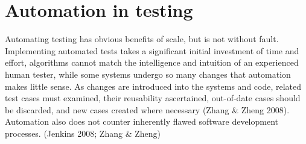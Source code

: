 \documentclass[12pt,a4paper,oneside,pdftex]{report}
\begin{document}
\begin{comment}
\begin{center}
    \begin{tabular}{ | l | l | l | p{5cm} |}
    \hline
    f & Interpretation error & Miscoded call error & Interface error \\ \hline
    Wrong & Unspecified function & Call at wrong location & Stardards or agreements are violated \\ \hline
    Missing & Not all necessary functionality implemented & Call instruction missing & Stardards or agreements are       violated \\ 
    \hline
    Extra & Function performs more than what is expected or needed & Call instruction on a path which should not have it & Stardards or agreements are violated \\
    \hline
    \end{tabular}
\end{center}


Interpretation
    wrong function - something else than specified
    extra function - more than what is expected/needed
    missing function - not all that is specified
Miscoded call (error which causes the developer to place the call instruction at the wrong point in the program)
    Extra instruction fault: the call instruction is on a path which should not have the call.
    Wrong placement fault: the call is at the wrong location on the path which should have the call instruction.
    Missing instruction fault: the call instruction is missing on the path which should have the call.
Interface error
    When stardards or agreements are violated

ERRORS: wrong function, extra function, missing function 
Miscoded call error
Interface error (Lueng \& white)
\end{comment}

\section{Automation in testing}

Automating testing has obvious benefits of scale, but is not without fault. Implementing automated tests takes a significant initial investment of time and effort, algorithms cannot match the intelligence and intuition of an experienced human tester, while some systems undergo so many changes that automation makes little sense. As changes are introduced into the systems and code, related test cases must examined, their reusability ascertained, out-of-date cases should be discarded, and new cases created where necessary (Zhang \& Zheng 2008). Automation also does not counter inherently flawed software development processes. (Jenkins 2008; Zhang \& Zheng)
\end{document}
